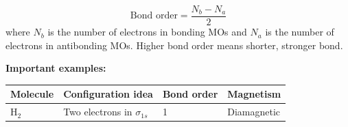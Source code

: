 \documentclass[12pt,a4paper]{article}
\begin{document}
\begin{tcolorbox}[formulabox, title={Bond Order}]
\[
\text{Bond order}=\frac{N_b-N_a}{2}
\]
where $N_b$ is the number of electrons in bonding MOs and $N_a$ is the number of electrons in antibonding MOs. Higher bond order means shorter, stronger bond.
\end{tcolorbox}

\textbf{Important examples:}\par\noindent
\begin{tabularx}{\linewidth}{|B{2.8cm}|Y|Y|Y|}
\hline
\textbf{Molecule} & \textbf{Configuration idea} & \textbf{Bond order} & \textbf{Magnetism} \\
\hline
$\mathrm{H_2}$ & Two electrons in $\sigma_{1s}$ & 1 & Diamagnetic \\
\hline
\hline
\end{tabularx}
\end{document}
